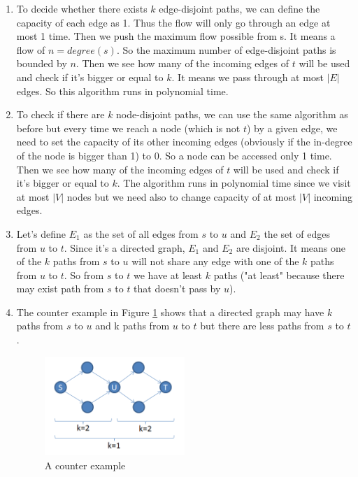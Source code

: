 \begin{enumerate}
	\item To decide whether there exists $k$ edge-disjoint paths, we can define the capacity of each edge as 1. Thus the flow will only go through an edge at most 1 time. Then we push the maximum flow possible from s. It means a flow of $n=degree(s)$. So the maximum number of edge-disjoint paths is bounded by $n$. Then we see how many of the incoming edges of $t$ will be used and check if it's bigger or equal to $k$. It means we pass through at most $|E|$ edges. So this algorithm runs in polynomial time.
	\item To check if there are $k$ node-disjoint paths, we can use the same algorithm as before but every time we reach a node (which is not $t$) by a given edge, we need to set the capacity of its other incoming edges (obviously if the in-degree of the node is bigger than 1) to 0. So a node can be accessed only 1 time. Then we see how many of the incoming edges of $t$ will be used and check if it's bigger or equal to $k$. The algorithm runs in polynomial time since we visit at most $|V|$ nodes but we need also to change capacity of at most $|V|$ incoming edges.
	\item Let's define $E_1$ as the set of all edges from $s$ to $u$ and $E_2$ the set of edges from $u$ to $t$. Since it's a directed graph, $E_1$ and $E_2$ are disjoint. It means one of the $k$ paths from $s$ to $u$ will not share any edge with one of the $k$ paths from $u$ to $t$. So from $s$ to $t$ we have at least $k$ paths ("at least" because there may exist path from $s$ to $t$ that doesn't pass by $u$).
	\item The counter example in Figure \ref{fig:counterexample} shows that a directed graph may have $k$ paths from $s$ to $u$ and k paths from $u$ to $t$ but there are less paths from $s$ to $t$.
	\begin{figure}[ht]
  \centering
  \includegraphics[width=0.5\textwidth]{counterexample}
  \caption{A counter example}
  \label{fig:counterexample}
  \end{figure}
\end{enumerate}
